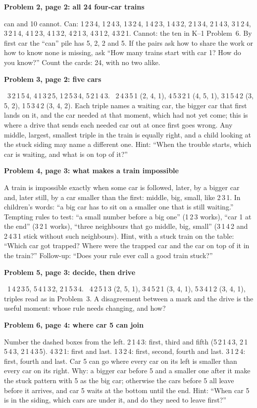 \documentclass[11pt]{article}
\newcommand{\sub}[1]{\par\needspace{3\baselineskip}\textbf{#1}\par\nopagebreak}
\newcommand{\yes}{\ding{51}}\newcommand{\no}{\ding{55}}
\newcommand{\tr}[1]{\mbox{#1}}
\begin{document}
\sub{Problem 2, page 2: all 24 four-car trains}
14 can and 10 cannot. Can: \tr{1\,2\,3\,4}, \tr{1\,2\,4\,3}, \tr{1\,3\,2\,4}, \tr{1\,4\,2\,3}, \tr{1\,4\,3\,2}, \tr{2\,1\,3\,4}, \tr{2\,1\,4\,3}, \tr{3\,1\,2\,4}, \tr{3\,2\,1\,4}, \tr{4\,1\,2\,3}, \tr{4\,1\,3\,2}, \tr{4\,2\,1\,3}, \tr{4\,3\,1\,2}, \tr{4\,3\,2\,1}. Cannot: the ten in K--1 Problem~6. By first car the ``can'' pile has 5, 2, 2 and 5. If the pairs ask how to share the work or how to know none is missing, ask ``How many trains start with car 1? How do you know?'' Count the cards: 24, with no two alike.

\sub{Problem 3, page 2: five cars}
\yes~\tr{3\,2\,1\,5\,4}, \tr{4\,1\,3\,2\,5}, \tr{1\,2\,5\,3\,4}, \tr{5\,2\,1\,4\,3}. \no~\tr{2\,4\,3\,5\,1} (2, 4, 1), \tr{4\,5\,3\,2\,1} (4, 5, 1), \tr{3\,1\,5\,4\,2} (3, 5, 2), \tr{1\,5\,3\,4\,2} (3, 4, 2). Each triple names a waiting car, the bigger car that first lands on it, and the car needed at that moment, which had not yet come; this is where a drive that sends each needed car out at once first goes wrong. Any middle, largest, smallest triple in the train is equally right, and a child looking at the stuck siding may name a different one. Hint: ``When the trouble starts, which car is waiting, and what is on top of it?''

\sub{Problem 4, page 3: what makes a train impossible}
A train is impossible exactly when some car is followed, later, by a bigger car and, later still, by a car smaller than the first: middle, big, small, like \tr{2\,3\,1}. In children's words: ``a big car has to sit on a smaller one that is still waiting.'' Tempting rules to test: ``a small number before a big one'' (\tr{1\,2\,3} works), ``car 1 at the end'' (\tr{3\,2\,1} works), ``three neighbours that go middle, big, small'' (\tr{3\,1\,4\,2} and \tr{2\,4\,3\,1} stick without such neighbours). Hint, with a stuck train on the table: ``Which car got trapped? Where were the trapped car and the car on top of it in the train?'' Follow-up: ``Does your rule ever call a good train stuck?''

\sub{Problem 5, page 3: decide, then drive}
\yes~\tr{1\,4\,2\,3\,5}, \tr{5\,4\,1\,3\,2}, \tr{2\,1\,5\,3\,4}. \no~\tr{4\,2\,5\,1\,3} (2, 5, 1), \tr{3\,4\,5\,2\,1} (3, 4, 1), \tr{5\,3\,4\,1\,2} (3, 4, 1), triples read as in Problem~3. A disagreement between a mark and the drive is the useful moment: whose rule needs changing, and how?

\sub{Problem 6, page 4: where car 5 can join}
Number the dashed boxes from the left. \tr{2\,1\,4\,3}: first, third and fifth (\tr{5\,2\,1\,4\,3}, \tr{2\,1\,5\,4\,3}, \tr{2\,1\,4\,3\,5}). \tr{4\,3\,2\,1}: first and last. \tr{1\,3\,2\,4}: first, second, fourth and last. \tr{3\,1\,2\,4}: first, fourth and last. Car 5 can go where every car on its left is smaller than every car on its right. Why: a bigger car before 5 and a smaller one after it make the stuck pattern with 5 as the big car; otherwise the cars before 5 all leave before it arrives, and car 5 waits at the bottom until the end. Hint: ``When car 5 is in the siding, which cars are under it, and do they need to leave first?''
\end{document}
